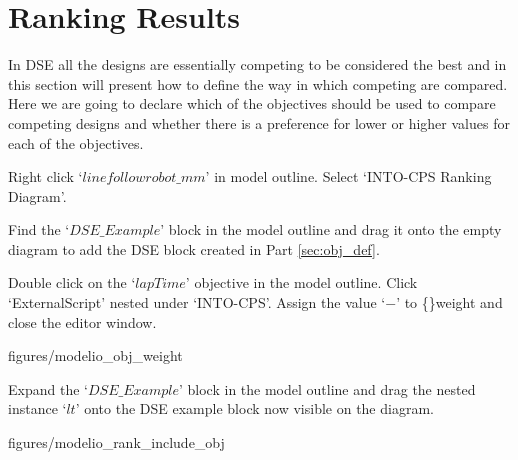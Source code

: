 \documentclass[11pt,a4paper]{../tutorial}
\begin{document}
\newpage
\section{Ranking Results}

In DSE all the designs are essentially competing to be considered the best and in this section will present how to define the way in which competing are compared.  Here we are going to declare which of the objectives should be used to compare competing designs and whether there is a preference for lower or higher values for each of the objectives.

\begin{instructions}

\item Right click `$linefollowrobot\_mm$' in model outline. Select `INTO-CPS \menusep Ranking Diagram'.

\item Find the `$DSE\_Example$' block in the model outline and drag it onto the empty diagram to add the DSE block created in Part \ref{sec:obj_def}.

\item \label{start_add_rank} Double click on the `$lapTime$' objective in the model outline. Click `ExternalScript' nested under `INTO-CPS'. Assign the value `$-$' to \{\}weight and close the editor window.

\begin{center}
\begin{annotation}[width=0.7\linewidth]{figures/modelio_obj_weight}
    \end{annotation}
\end{center}

\newpage

\item Expand the `$DSE\_Example$' block in the model outline and drag the nested instance `$lt$' onto the DSE example block now visible on the diagram.

\begin{center}
\begin{annotation}[width=0.7\linewidth]{figures/modelio_rank_include_obj}
    \end{annotation}
\end{center}


\end{instructions}
\end{document}

